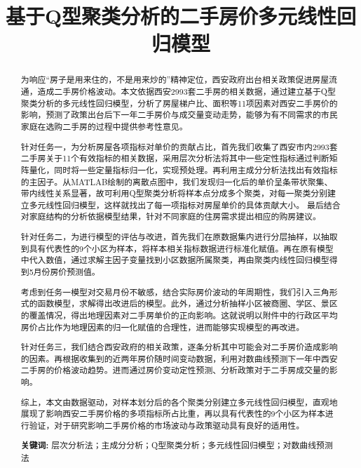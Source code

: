 \documentclass[withoutpreface,bwprint]{cumcmthesis} %
\title{基于Q型聚类分析的二手房价多元线性回归模型}
\begin{document}

\maketitle

\begin{abstract}%
    为响应“房子是用来住的，不是用来炒的”精神定位，西安政府出台相关政策促进房屋流通，造成二手房价格波动。本文依据西安2993套二手房的相关数据，通过建立基于Q型聚类分析的多元线性回归模型，分析了房屋梯户比、面积等11项因素对西安二手房价的影响，预测了政策出台后下一年二手房价与成交量变动走势，能够为有不同需求的市民家庭在选购二手房的过程中提供参考性意见。
   
    针对任务一，为分析房屋各项指标对单价的贡献占比，首先我们收集了西安市内2993套二手房关于11个有效指标的相关数据，采用层次分析法将其中一些定性指标通过判断矩阵量化，同时将一些定量指标归一化，实现预处理。再利用主成分分析法找出有效指标的主因子。从MATLAB绘制的离散点图中，我们发现归一化后的单价呈条带状聚集、带内线性关系显著，故可利用Q型聚类分析将样本点分成多个聚类，对每一聚类分别建立多元线性回归模型，这样就找出了每一项指标对房屋单价的具体贡献大小。 最后结合对家庭结构的分析依据模型结果，针对不同家庭的住房需求提出相应的购房建议。
    
    针对任务二，为进行模型的评估与改进，首先我们在原数据集内进行分层抽样，以抽取到具有代表性的9个小区为样本，将样本相关指标数据进行标准化赋值。再在原有模型中代入数值，通过求解主因子变量找到小区数据所属聚类，再由聚类内线性回归模型得到5月份房价预测值。
    
    考虑到任务一模型对交易月份不敏感，结合实际房价波动的年周期性，我们引入三角形式的函数模型，求解得出改进后的模型。此外，通过分析抽样小区被商圈、学区、景区的覆盖情况，得出地理因素对二手房单价的正向影响。这就说明以附件中的行政区平均房价占比作为地理因素的归一化赋值的合理性，进而能够实现模型的再改进。
    
    针对任务三，我们结合西安政府的相关政策，逐条分析其中可能会对二手房价造成影响的因素。再根据收集到的近两年房价随时间变动数据，利用对数曲线预测下一年中西安二手房的价格波动趋势。进而通过房价变动定性预测、分析政策对于二手房成交量的影响。
   
    综上，本文由数据驱动，对样本划分后的各个聚类分别建立多元线性回归模型，直观地展现了影响西安二手房价格的多项指标所占比重，再以具有代表性的9个小区为样本进行验证，对于研究影响二手房价格的市场波动与政策驱动具有良好的适用性。

  \textbf{关键词:} 层次分析法；主成分分析；Q型聚类分析；多元线性回归模型；对数曲线预测法

\end{abstract}
\end{document}
